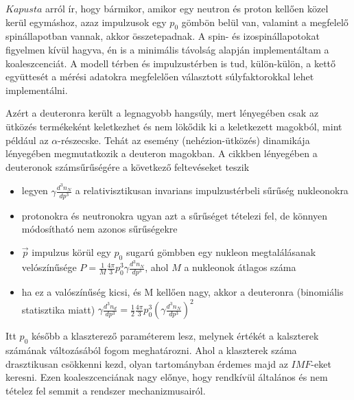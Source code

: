 \documentclass[a4paper,12pt]{article}
\begin{document}
\vspace{5mm}

\par $Kapusta$ arról ír, hogy bármikor, amikor egy neutron és proton kellően közel kerül egymáshoz, azaz impulzusok egy $p_{0}$ gömbön belül van, valamint a megfelelő spinállapotban vannak, akkor összetepadnak. A spin- és izospinállapotokat figyelmen kívül hagyva, én is a minimális távolság alapján implementáltam a koaleszcenciát. A modell térben és impulzustérben is tud, külön-külön, a kettő együttesét a mérési adatokra megfelelően választott súlyfaktorokkal lehet implementálni.

\vspace{5mm}

\par Azért a deuteronra került a legnagyobb hangsúly, mert lényegében csak az ütközés termékeként keletkezhet és nem lökődik ki a keletkezett magokból, mint például az $\alpha$-részecske. Tehát az esemény (nehézion-ütközés) dinamikája lényegében megmutatkozik a deuteron magokban. A cikkben lényegében a deuteronok számsűrűségére a következő feltevéseket teszik

\begin{itemize}
\item legyen $\gamma \frac{d^{3}n_{N}}{dp^{3}}$ a relativisztikusan invarians impulzustérbeli sűrűség nukleonokra
\item protonokra és neutronokra ugyan azt a sűrűséget tételezi fel, de könnyen módosítható nem azonos sűrűségekre
\item $\vec{p}$ impulzus körül egy $p_{0}$ sugarú gömbben egy nukleon megtalálásanak velószínűsége $P = \frac{1}{M}\frac{4\pi}{3}p_{0}^{3}\gamma \frac{d^{3}n_{N}}{dp^{3}}$, ahol $M$ a nukleonok átlagos száma
\item ha ez a valószínűség kicsi, és M kellően nagy, akkor a deuteronra (binomiális statisztika miatt) $\gamma \frac{d^{3}n_{d}}{dp^{3}} = \frac{1}{2}\frac{4\pi}{3}p_{0}^{3}(\gamma \frac{d^{3}n_{N}}{dp^{3}})^{2}$
\end{itemize}

\par Itt $p_{0}$ később a klaszterező paraméterem lesz, melynek értékét a kalszterek számának változásából fogom meghatározni. Ahol a klaszterek száma drasztikusan csökkenni kezd, olyan tartományban érdemes majd az $IMF$-eket keresni. Ezen koaleszcenciának nagy előnye, hogy rendkívül általános és nem tételez fel semmit a rendszer mechanizmusairól.

\vspace{5mm}
\end{document}
